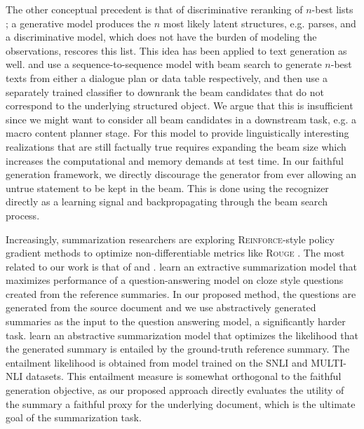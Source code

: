 The other conceptual precedent is that of discriminative reranking 
of $n$-best lists \citep{collins2005discriminative,charniak2005coarse};
a generative model produces the $n$ most likely latent structures, e.g. parses,
and a discriminative model, which does not have the burden of modeling
the observations, rescores this list.  This idea has been applied 
to text generation as well. \cite{wen2015stochastic} and 
\cite{novikova2017e2e} use a 
sequence-to-sequence
model with beam search to generate $n$-best texts from either a 
dialogue plan or data table respectively,
 and then use a separately trained
classifier to downrank the beam candidates that do not correspond to the 
underlying
structured object.
We argue that this is insufficient since we might want to consider 
all beam candidates in a downstream task, e.g. a macro content planner stage.
For this model to provide linguistically interesting realizations that are 
still
factually true requires expanding the beam size 
which increases the computational and memory demands at test time. 
In our faithful generation framework, we directly discourage the generator from
ever allowing an untrue statement to be kept in the beam. This is done
using the recognizer directly as a learning signal and backpropagating
through the beam search process.

Increasingly, summarization researchers are exploring
 \textsc{Reinforce}-style
policy gradient methods to optimize non-differentiable metrics like 
\textsc{Rouge} \citep{paulus2017deep,arumae2018reinforced,kryscinski2018improving,narayan2018ranking,pasunuru2018multi}.
The most related to our work is that of \cite{arumae2018reinforced} 
and \cite{pasunuru2018multi}.
\cite{arumae2018reinforced} 
learn an extractive summarization model that maximizes
performance of a question-answering model on cloze style questions created
from the reference summaries. In our proposed method, the questions are 
generated from the source document and we use abstractively generated 
summaries as
the input to the question answering model, a significantly harder task.
\cite{pasunuru2018multi} learn an abstractive summarization model that
optimizes the likelihood that the generated summary is entailed by the 
ground-truth reference summary. The entailment likelihood is obtained from
model trained on the SNLI \citep{bowman2015large} and MULTI-NLI 
\citep{williams2018broad} datasets.
This entailment measure is somewhat orthogonal to the faithful generation 
objective, as our proposed
approach directly evaluates the utility of the summary a faithful proxy
for the underlying document, which is the ultimate goal of the 
summarization task.


